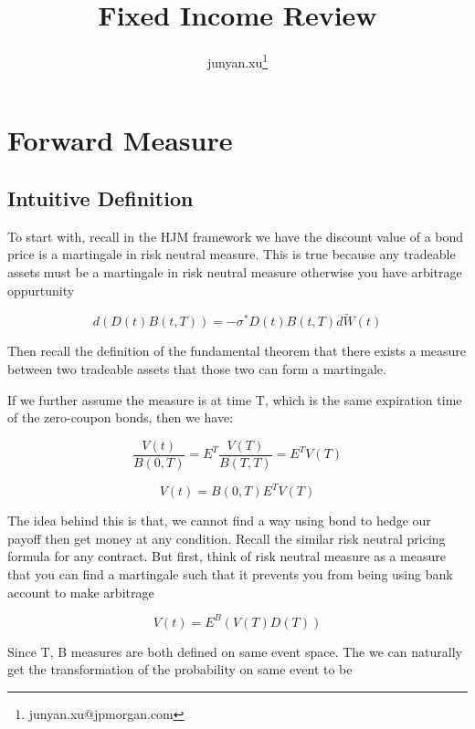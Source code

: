 \documentclass[11pt, oneside]{article}   	%
\title{Fixed Income Review}
\author{junyan.xu\footnote{junyan.xu@jpmorgan.com}}
\begin{document}
\maketitle
\tableofcontents
\newpage

\section{Forward Measure}

\subsection{Intuitive Definition}

To start with, recall in the HJM framework we have the discount value of a bond price is a martingale in risk neutral measure. This is true
because any tradeable assets must be a martingale in risk neutral measure otherwise you have arbitrage oppurtunity

\begin{equation}
  d(D(t)B(t, T)) = -\sigma^{\ast}D(t)B(t, T)d\widetilde{W}(t)
\end{equation}

Then recall the definition of the fundamental theorem that there exists a measure between two tradeable assets that those two can form a martingale.

If we further assume the measure is at time T, which is the same expiration time of the zero-coupon bonds, then we have:

\begin{equation}
  \frac{V(t)}{B(0, T)} = E^{T}\frac{V(T)}{B(T, T)} = E^{T}V(T) 
\end{equation}

\begin{equation}
  V(t) = B(0, T)E^{T}V(T) 
\end{equation}

The idea behind this is that, we cannot find a way using bond to hedge our payoff then get money at any condition. Recall the similar risk neutral
pricing formula for any contract. But first, think of risk neutral measure as a measure that you can find a martingale such that it prevents you from being using
bank account to make arbitrage

\begin{equation}
  V(t) = E^{B}(V(T)D(T))
\end{equation}


Since T, B measures are both defined on same event space. The we can naturally get the transformation of the probability on same event to be
\end{document}
